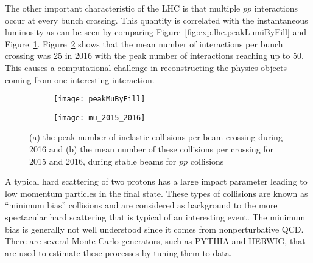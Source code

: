 The other important characteristic of the LHC is that multiple $pp$ interactions occur at every 
bunch crossing.  This quantity is correlated with the instantaneous luminosity as can be seen 
by comparing Figure~\ref{fig:exp.lhc.peakLumiByFill} and Figure~\ref{fig:exp.lhc.peakMuByFill}. Figure~\ref{fig:exp.mu_2015_2016}
shows that the mean number of interactions per bunch crossing was 25 in 2016 with the peak number of interactions 
reaching up to 50. This causes a computational challenge in reconstructing the physics objects coming from 
one interesting interaction.
\begin{figure}[!htb]
\centering
\begin{subfigure}[t]{0.48\textwidth}
\texttt{[image: peakMuByFill]}
\subcaption{}
\label{fig:exp.lhc.peakMuByFill}
\end{subfigure}
\begin{subfigure}[t]{0.48\textwidth}
\texttt{[image: mu\_2015\_2016]}
\subcaption{}
\label{fig:exp.mu_2015_2016}
\end{subfigure}
\vspace{-0.25cm}
\caption{(a) the peak number of inelastic collisions per beam crossing during 2016 
  and (b) the mean number of these collisions per crossing for 2015 and 2016, during stable beams for $pp$ collisions}
\label{fig:exp.lhc.int}
\end{figure} 
A typical hard scattering of two protons has a large impact parameter leading to low momentum particles in the final 
state. These types of collisions are known as ``minimum bias'' collisions and are considered as background to 
the more spectacular hard scattering that is typical of an interesting event. 
The minimum bias is generally not well understood since it comes from nonperturbative QCD. There are several Monte Carlo generators, such as {\sc PYTHIA} and
{\sc HERWIG}, that are used to estimate these processes by tuning them to 
data.


